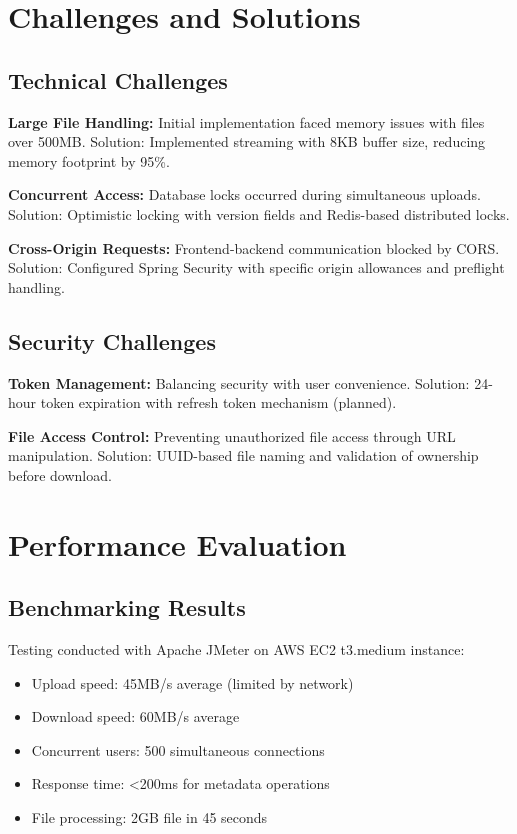 \documentclass[final]{cvpr}
\begin{document}
\section{Challenges and Solutions}
\label{sec:challenges}

\subsection{Technical Challenges}

\textbf{Large File Handling:} Initial implementation faced memory issues with files over 500MB. Solution: Implemented streaming with 8KB buffer size, reducing memory footprint by 95\%.

\textbf{Concurrent Access:} Database locks occurred during simultaneous uploads. Solution: Optimistic locking with version fields and Redis-based distributed locks.

\textbf{Cross-Origin Requests:} Frontend-backend communication blocked by CORS. Solution: Configured Spring Security with specific origin allowances and preflight handling.

\subsection{Security Challenges}

\textbf{Token Management:} Balancing security with user convenience. Solution: 24-hour token expiration with refresh token mechanism (planned).

\textbf{File Access Control:} Preventing unauthorized file access through URL manipulation. Solution: UUID-based file naming and validation of ownership before download.

\section{Performance Evaluation}

\subsection{Benchmarking Results}
Testing conducted with Apache JMeter on AWS EC2 t3.medium instance:
\begin{itemize}
    \item Upload speed: 45MB/s average (limited by network)
    \item Download speed: 60MB/s average  
    \item Concurrent users: 500 simultaneous connections
    \item Response time: <200ms for metadata operations
    \item File processing: 2GB file in 45 seconds
\end{itemize}
\end{document}
